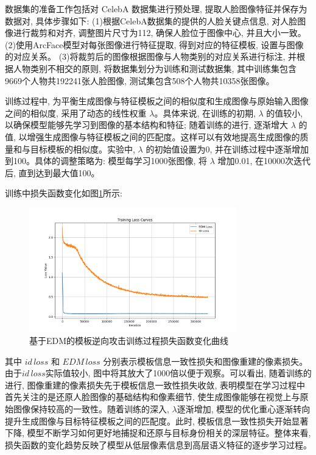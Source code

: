 数据集的准备工作包括对 CelebA 数据集进行预处理, 提取人脸图像特征并保存为数据对, 具体步骤如下:
(1)根据CelebA数据集的提供的人脸关键点信息, 对人脸图像进行裁剪和对齐, 调整图片尺寸为112, 确保人脸位于图像中心, 并且大小一致。
(2)使用ArcFace模型对每张图像进行特征提取, 得到对应的特征模板, 设置与图像的对应关系。
(3)将裁剪后的图像根据图像与人物类别的对应关系进行标注, 并根据人物类别不相交的原则, 将数据集划分为训练和测试数据集, 其中训练集包含9669个人物共192241张人脸图像, 测试集包含508个人物共10358张图像。

训练过程中, 为平衡生成图像与特征模板之间的相似度和生成图像与原始输入图像之间的相似度, 采用了动态的线性权重 $\lambda$。具体来说, 在训练的初期, $\lambda$ 的值较小, 以确保模型能够先学习到图像的基本结构和特征; 随着训练的进行, 逐渐增大 $\lambda$ 的值, 以增强生成图像与特征模板之间的匹配度。这样可以有效地提高生成图像的质量和与目标模板的相似度。实验中, $\lambda$ 的初始值设置为0, 并在训练过程中逐渐增加到100。具体的调整策略为: 模型每学习1000张图像, 将 $\lambda$ 增加0.01, 在10000次迭代后, 直到达到最大值100。

训练中损失函数变化如图\ref{fig:edm_template_attack_loss}所示:

\begin{figure}[htbp]
  \centering
  \includegraphics[width=0.8\textwidth]{images/loss_curve.png}
  \caption{基于EDM的模板逆向攻击训练过程损失函数变化曲线}
  \label{fig:edm_template_attack_loss}
\end{figure}

其中 $id\,loss$ 和 $EDM\,loss$ 分别表示模板信息一致性损失和图像重建的像素损失。由于$id\,loss$实际值较小, 图中将其放大了1000倍以便于观察。可以看出, 随着训练的进行, 图像重建的像素损失先于模板信息一致性损失收敛, 表明模型在学习过程中首先关注的是还原人脸图像的基础结构和像素细节, 使生成图像能够在视觉上与原始图像保持较高的一致性。随着训练的深入, $\lambda$逐渐增加, 模型的优化重心逐渐转向提升生成图像与目标特征模板之间的匹配度。此时, 模板信息一致性损失开始显著下降, 模型不断学习如何更好地捕捉和还原与目标身份相关的深层特征。整体来看, 损失函数的变化趋势反映了模型从低层像素信息到高层语义特征的逐步学习过程。

